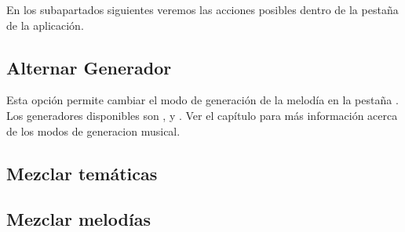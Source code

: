 En los subapartados siguientes veremos las acciones posibles dentro de la pestaña \advancedTabName{} de la aplicación.

\subsection{Alternar Generador}
\label{subsec:alternarGenerador}
Esta opción permite cambiar el modo de generación de la melodía en la pestaña \generationTabName{}. Los generadores disponibles son ,  y . Ver el capítulo  para más información acerca de los modos de generacion musical.

\subsection{Mezclar temáticas}

\subsection{Mezclar melodías}
